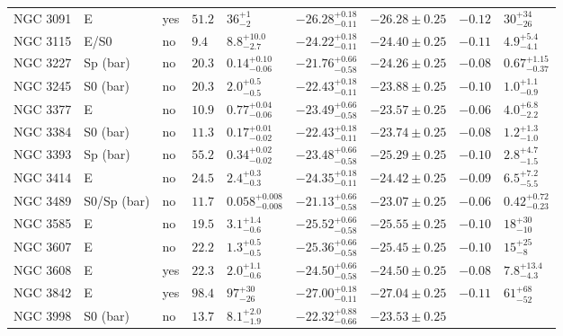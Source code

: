 \begin{table*}
\begin{center}
\begin{tabular}{llllllrll}
NGC 3091  &  E  &  yes   &  $51.2$  &  $36_{-2}^{+1}$   &  $-26.28_{-0.11}^{+0.18}$   &  $-26.28 \pm 0.25$ 
 &  $-0.12$  &  $30_{-26}^{+34}$   \\ 
NGC 3115  &  E/S0  &  no   &  $9.4$  &  $8.8_{-2.7}^{+10.0}$   &  $-24.22_{-0.11}^{+0.18}$   &  $-24.40 \pm 0.25$ 
 &  $-0.11$  &  $4.9_{-4.1}^{+5.4}$   \\ 
NGC 3227  &  Sp (bar)  &  no   &  $20.3$  &  $0.14_{-0.06}^{+0.10}$   &  $-21.76_{-0.58}^{+0.66}$   &  $-24.26 \pm 0.25$ 
 &  $-0.08$  &  $0.67_{-0.37}^{+1.15}$   \\ 
NGC 3245  &  S0 (bar)  &  no   &  $20.3$  &  $2.0_{-0.5}^{+0.5}$   &  $-22.43_{-0.11}^{+0.18}$   &  $-23.88 \pm 0.25$ 
 &  $-0.10$  &  $1.0_{-0.9}^{+1.1}$   \\ 
NGC 3377  &  E  &  no   &  $10.9$  &  $0.77_{-0.06}^{+0.04}$   &  $-23.49_{-0.58}^{+0.66}$   &  $-23.57 \pm 0.25$ 
 &  $-0.06$  &  $4.0_{-2.2}^{+6.8}$   \\ 
NGC 3384  &  S0 (bar)  &  no   &  $11.3$  &  $0.17_{-0.02}^{+0.01}$   &  $-22.43_{-0.11}^{+0.18}$   &  $-23.74 \pm 0.25$ 
 &  $-0.08$  &  $1.2_{-1.0}^{+1.3}$   \\ 
NGC 3393  &  Sp (bar)  &  no   &  $55.2$  &  $0.34_{-0.02}^{+0.02}$   &  $-23.48_{-0.58}^{+0.66}$   &  $-25.29 \pm 0.25$ 
 &  $-0.10$  &  $2.8_{-1.5}^{+4.7}$   \\ 
NGC 3414  &  E  &  no   &  $24.5$  &  $2.4_{-0.3}^{+0.3}$   &  $-24.35_{-0.11}^{+0.18}$   &  $-24.42 \pm 0.25$ 
 &  $-0.09$  &  $6.5_{-5.5}^{+7.2}$   \\ 
NGC 3489  &  S0/Sp (bar)  &  no   &  $11.7$  &  $0.058_{-0.008}^{+0.008}$   &  $-21.13_{-0.58}^{+0.66}$   &  $-23.07 \pm 0.25$ 
 &  $-0.06$  &  $0.42_{-0.23}^{+0.72}$   \\ 
NGC 3585  &  E  &  no   &  $19.5$  &  $3.1_{-0.6}^{+1.4}$   &  $-25.52_{-0.58}^{+0.66}$   &  $-25.55 \pm 0.25$ 
 &  $-0.10$  &  $18_{-10}^{+30}$   \\ 
NGC 3607  &  E  &  no   &  $22.2$  &  $1.3_{-0.5}^{+0.5}$   &  $-25.36_{-0.58}^{+0.66}$   &  $-25.45 \pm 0.25$ 
 &  $-0.10$  &  $15_{-8}^{+25}$   \\ 
NGC 3608  &  E  &  yes   &  $22.3$  &  $2.0_{-0.6}^{+1.1}$   &  $-24.50_{-0.58}^{+0.66}$   &  $-24.50 \pm 0.25$ 
 &  $-0.08$  &  $7.8_{-4.3}^{+13.4}$   \\ 
NGC 3842  &  E  &  yes   &  $98.4$  &  $97_{-26}^{+30}$   &  $-27.00_{-0.11}^{+0.18}$   &  $-27.04 \pm 0.25$ 
 &  $-0.11$  &  $61_{-52}^{+68}$   \\ 
NGC 3998  &  S0 (bar)  &  no   &  $13.7$  &  $8.1_{-1.9}^{+2.0}$   &  $-22.32_{-0.66}^{+0.88}$   &  $-23.53 \pm 0.25$ 

\end{tabular}
\end{center}
\end{table*}
